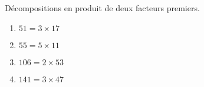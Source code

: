     Décompositions en produit de deux facteurs premiers.
    \begin{enumerate}
        \item $51=3\times 17$
        \item $55=5\times 11$
        \item $106=2\times 53$
        \item $141=3\times 47$
    \end{enumerate}
